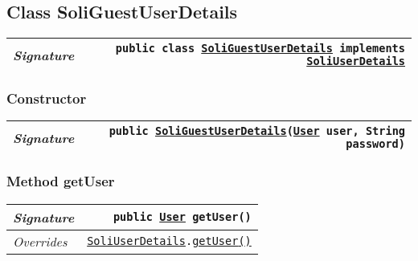 \begin{adjustwidth}{1.5em}{0pt}
\begin{adjustwidth}{1.5em}{0pt}
\begin{adjustwidth}{1.5em}{0pt}
{\begin{tabularx}{1.0\linewidth}{@{}l R@{}}
      \end{tabularx}}
    \end{adjustwidth}
  \end{adjustwidth}\subsection{Class SoliGuestUserDetails\label{edu.kit.hci.soli.config.security.SoliGuestUserDetails} }
  \begin{adjustwidth}{1.5em}{0pt}
    {\begin{tabularx}{1.0\linewidth}{@{}l R@{}}
      \emph{Signature} & \texttt{public  class \texttt{\hyperref[edu.kit.hci.soli.config.security.SoliGuestUserDetails]{\texttt{SoliGuestUserDetails}} implements \texttt{\hyperref[edu.kit.hci.soli.config.security.SoliUserDetails]{\texttt{SoliUserDetails}}}}} \\
      \hline
  
    \end{tabularx}}\subsubsection{Constructor\label{edu.kit.hci.soli.config.security.SoliGuestUserDetails@edu.kit.hci.soli.config.security.SoliGuestUserDetails(edu.kit.hci.soli.domain.User,java.lang.String)}}
    \begin{adjustwidth}{1.5em}{0pt}
      {\begin{tabularx}{1.0\linewidth}{@{}l R@{}}
        \emph{Signature} & \texttt{public \texttt{\hyperref[edu.kit.hci.soli.config.security.SoliGuestUserDetails]{\texttt{SoliGuestUserDetails}}}(\texttt{\hyperref[edu.kit.hci.soli.domain.User]{\texttt{User}}} user, \texttt{String} password)} \\
        \hline
  
      \end{tabularx}}
    \end{adjustwidth}\subsubsection{Method getUser\label{edu.kit.hci.soli.config.security.SoliGuestUserDetails@getUser()}}
    \begin{adjustwidth}{1.5em}{0pt}
      {\begin{tabularx}{1.0\linewidth}{@{}l R@{}}
        \emph{Signature} & \texttt{public \texttt{\hyperref[edu.kit.hci.soli.domain.User]{\texttt{User}}} getUser()} \\
        \hline
        \emph{Overrides} & \texttt{\texttt{\hyperref[edu.kit.hci.soli.config.security.SoliUserDetails]{\texttt{SoliUserDetails}}}.\hyperref[edu.kit.hci.soli.config.security.SoliUserDetails@getUser()]{getUser}\hyperref[edu.kit.hci.soli.config.security.SoliUserDetails@getUser()]{(}\hyperref[edu.kit.hci.soli.config.security.SoliUserDetails@getUser()]{)}} \\
        \hline
  

\end{tabularx}}
\end{adjustwidth}
\end{adjustwidth}
\end{adjustwidth}
